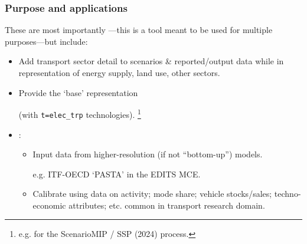 \documentclass[12pt,aspectratio=169]{beamer}
\begin{document}
\begin{frame}
\frametitle{Purpose and applications}

These are most importantly —this is a tool meant to be used for multiple purposes—but include:
\begin{itemize}
  \item Add transport sector detail to scenarios \& reported/output data while  in representation of energy supply, land use, other sectors.
  \item Provide  the ‘base’ representation

  (with \texttt{t=elec\_trp} technologies).%
  \footnote{e.g. for the ScenarioMIP / SSP (2024) process.}
  \item {}:
  \begin{itemize}
    \item Input data from higher-resolution (if not “bottom-up”) models.

    e.g. ITF-OECD ‘PASTA’ in the EDITS MCE.
    \item Calibrate using data on activity; mode share; vehicle stocks/sales; techno-economic attributes; etc. common in transport research domain.
  \end{itemize}
\end{itemize}
\end{frame}
\end{document}

